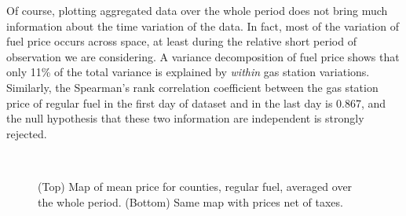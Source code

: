 \documentclass[10pt]{article}
\begin{document}
Of course, plotting aggregated data over the whole period does not bring much information about the time variation of the data. In fact, most of the variation of fuel price occurs across space, at least during the relative short period of observation we are considering. A variance decomposition of fuel price shows that only 11\% of the total variance is explained by \emph{within} gas station variations. Similarly, the Spearman's rank correlation coefficient between the gas station price of regular fuel in the first day of dataset and in the last day is 0.867, and the null hypothesis that these two information are independent is strongly rejected.

\begin{figure}
\centering
{}\\
\caption{(Top) Map of mean price for counties, regular fuel, averaged over the whole period. (Bottom) Same map with prices net of taxes.}\vspace{-0.3cm}
\label{fig:maps_price}
\end{figure}
\end{document}
